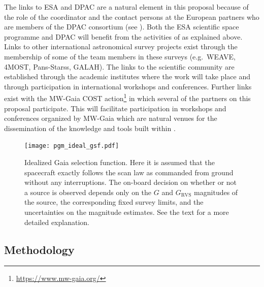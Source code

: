 The links to ESA and DPAC are a natural element in this proposal because of the role of the coordinator and the contact persons at the European partners who are members of the DPAC consortium (see ). Both the ESA scientific space programme and DPAC will benefit from the activities of {\acro} as explained above. Links to other international astronomical survey projects exist through the membership of some of the {\acro} team members in these surveys (e.g.\ WEAVE, 4MOST, Pans-Starss, GALAH). The links to the scientific community are established through the academic institutes where the work will take place and through participation in international workshops and conferences. Further links exist with the MW-Gaia COST action\footnote{\url{https://www.mw-gaia.org/}} in which several of the partners on this proposal participate. This will facilitate participation in workshops and conferences organized by MW-Gaia which are natural venues for the dissemination of the knowledge and tools built within {\acro}.

\begin{figure}[t]
    \centering
    \texttt{[image: pgm\_ideal\_gsf.pdf]}
    \caption{Idealized Gaia selection function. Here it is assumed that the spacecraft exactly follows the scan law as commanded from ground without any interruptions. The on-board decision on whether or not a source is observed depends only on the $G$ and $G_\mathrm{RVS}$ magnitudes of the source, the corresponding fixed survey limits, and the uncertainties on the magnitude estimates. See the text for a more detailed explanation.}
    \label{fig:gsf_ideal}
\end{figure}

\subsection{Methodology}
\label{sec:methods}

